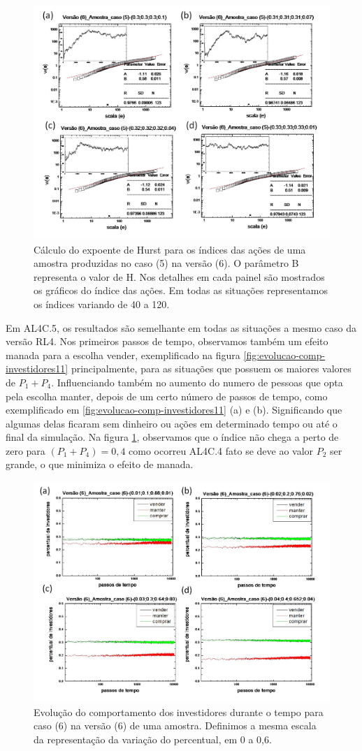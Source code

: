 \documentclass[brazil,ruledheader]{abnt}
\begin{document}
\begin{figure}[!h]
\centering
\includegraphics[width=.7\linewidth]{Figuras/40.jpg}
\caption{Cálculo do expoente de Hurst para os índices das ações de uma amostra
produzidas no caso (5) na  versão (6).  O parâmetro B representa o valor de H.
Nos detalhes em cada painel são mostrados os gráficos do índice das ações. Em
todas as situações representamos os índices variando de 40 a 120. }
\label{fig:calculo-exp-hurst14}
\end{figure}

Em AL4C.5, os resultados são semelhante em todas as situações a
mesmo caso da versão RL4. Nos primeiros passos de tempo, observamos também um
efeito manada para a escolha vender, exemplificado na figura
\ref{fig:evolucao-comp-investidores11} principalmente, para as situações 
que possuem os maiores valores de $P_1 + P_4$. Influenciando também no aumento
do numero de pessoas que opta pela escolha manter, depois de um certo número de 
passos de tempo, como exemplificado em \ref{fig:evolucao-comp-investidores11}
(a) e (b). Significando que algumas delas ficaram sem dinheiro ou ações em
determinado tempo ou até o
final da simulação. Na figura \ref{fig:calculo-exp-hurst14}, observamos
que o índice não chega a perto de zero para $(P_1+ P_4)=0,4$ como ocorreu AL4C.4
fato se deve ao valor $P_2$ ser grande, o que minimiza o efeito de manada.

\begin{figure}[!h]
\centering
\includegraphics[width=.7\linewidth]{Figuras/41.jpg}
\caption{Evolução do comportamento dos investidores durante o tempo para caso
(6) na  versão (6) de uma amostra. Definimos a mesma escala da representação da
variação do percentual, em 0 a 0,6. }
\label{fig:evolucao-comp-investidores12}
\end{figure}
\end{document}
